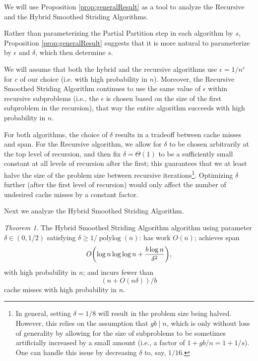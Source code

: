 \documentclass[11pt]{article}
\DeclarePairedDelimiter{\paren}{(}{)}
\newcommand{\polylog}{\operatorname{polylog}}
\theoremstyle{remark}
\newtheorem{theorem}{Theorem}[section]
\theoremstyle{remark}
\begin{document}
We will use Proposition \ref{prop:generalResult} as a tool to analyze the Recursive and the Hybrid Smoothed Striding Algorithms.

Rather than parameterizing the Partial Partition step in each algorithm by $s$, Proposition \ref{prop:generalResult} suggests that it is more natural to parameterize by $\epsilon$ and $\delta$, which then determine $s$.

We will assume that both the hybrid and the recursive algorithms use $\epsilon = 1/n^c$ for $c$ of our choice (i.e. with high probability in $n$). Moreover, the Recursive Smoothed Striding Algorithm continues to use the same value of $\epsilon$ within recursive subproblems (i.e., the $\epsilon$ is chosen based on the size of the first subproblem in the recursion), that way the entire algorithm succeeds with high probability in $n$.

For both algorithms, the choice of $\delta$ results in a tradeoff between cache misses and span. For the Recursive algorithm, we allow for $\delta$ to be chosen arbitrarily at the top level of recursion, and then fix $\delta  = \Theta(1)$ to be a sufficiently small constant at all levels of recursion after the first; this guarantees that we at least halve the size of the problem size between recursive iterations\footnote{In general, setting $\delta = 1/8$ will result in the problem size being halved. However, this relies on the assumption that $gb \mid n$, which is only without loss of generality by allowing for the size of subproblems to be sometimes artificially increased by a small amount (i.e., a factor of $1 + gb / n = 1 + 1/s$). One can handle this issue by decreasing $\delta$ to, say, $1/16$.}. Optimizing $\delta$ further (after the first level of recursion) would only affect the number of undesired cache misses by a constant factor.




Next we analyze the Hybrid Smoothed Striding Algorithm.
\begin{theorem}
	\label{thm:fullPartition}
	The Hybrid Smoothed Striding Algorithm algorithm using parameter $\delta\in(0,1/2)$ satisfying $\delta \ge 1/\polylog(n)$: has work $O(n)$; achieves span
        $$O\paren*{\log n \log\log n +\frac{b\log n}{\delta^2}},$$
with high probability in $n$; and incurs fewer than 
$$(n+O(n\delta))/b$$
cache misses with high probability in $n$.
\end{theorem}
\end{document}
